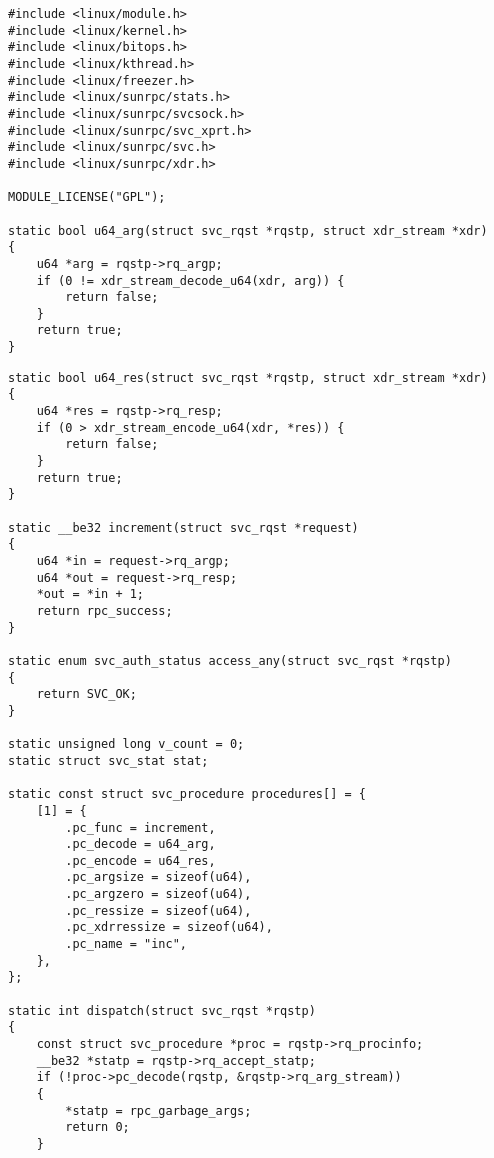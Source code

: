 \begin{lstlisting}[caption={Прототип сервера (часть 1)}, label={lst:server_prototype1}]
#include <linux/module.h>
#include <linux/kernel.h>
#include <linux/bitops.h>
#include <linux/kthread.h>
#include <linux/freezer.h>
#include <linux/sunrpc/stats.h>
#include <linux/sunrpc/svcsock.h>
#include <linux/sunrpc/svc_xprt.h>
#include <linux/sunrpc/svc.h>
#include <linux/sunrpc/xdr.h>

MODULE_LICENSE("GPL");

static bool u64_arg(struct svc_rqst *rqstp, struct xdr_stream *xdr)
{
    u64 *arg = rqstp->rq_argp;
    if (0 != xdr_stream_decode_u64(xdr, arg)) {
        return false;
    }
    return true;
}
\end{lstlisting}
\clearpage
\begin{lstlisting}[caption={Прототип сервера (часть 2)}, label={lst:server_prototype2}]
static bool u64_res(struct svc_rqst *rqstp, struct xdr_stream *xdr)
{
    u64 *res = rqstp->rq_resp;
    if (0 > xdr_stream_encode_u64(xdr, *res)) {
        return false;
    }
    return true;
}

static __be32 increment(struct svc_rqst *request)
{
    u64 *in = request->rq_argp;
    u64 *out = request->rq_resp;
    *out = *in + 1;
    return rpc_success;
}

static enum svc_auth_status access_any(struct svc_rqst *rqstp)
{
    return SVC_OK;
}

static unsigned long v_count = 0;
static struct svc_stat stat;

static const struct svc_procedure procedures[] = {
    [1] = {
        .pc_func = increment,
        .pc_decode = u64_arg,
        .pc_encode = u64_res,
        .pc_argsize = sizeof(u64),
        .pc_argzero = sizeof(u64),
        .pc_ressize = sizeof(u64),
        .pc_xdrressize = sizeof(u64),
        .pc_name = "inc",
    },
};

static int dispatch(struct svc_rqst *rqstp)
{
    const struct svc_procedure *proc = rqstp->rq_procinfo;
    __be32 *statp = rqstp->rq_accept_statp;
    if (!proc->pc_decode(rqstp, &rqstp->rq_arg_stream))
    {
        *statp = rpc_garbage_args;
        return 0;
    }
\end{lstlisting}
\clearpage
